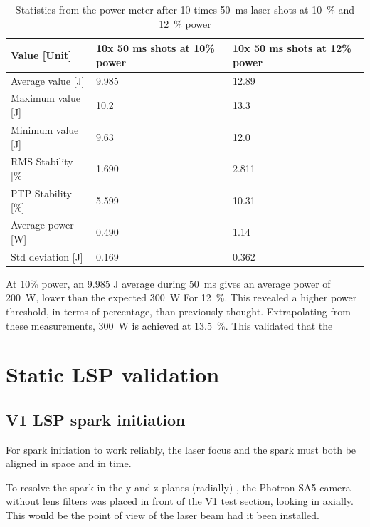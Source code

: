             \begin{table}[!ht]
                \caption{Statistics from the power meter after 10 times \qty{50}{ms} laser shots at \qty{10}{\%} and \qty{12}{\%} power}
                \label{tab:laser shot statistics}
                \begin{tabular}{lll}
                \textbf{Value {[}Unit{]}} & \textbf{10x 50 ms shots at 10\% power} & \textbf{10x 50 ms shots at 12\% power} \\ \hline
                Average value {[}J{]}  & 9.985 & 12.89 \\
                Maximum value {[}J{]}  & 10.2  & 13.3  \\
                Minimum value {[}J{]}  & 9.63  & 12.0  \\
                RMS Stability {[}\%{]} & 1.690 & 2.811 \\
                PTP Stability {[}\%{]} & 5.599 & 10.31 \\
                Average power {[}W{]}  & 0.490 & 1.14  \\
                Std deviation {[}J{]}  & 0.169 & 0.362 \\ \hline
                \end{tabular}
            \end{table}
            
            At 10\% power, an 9.985 J average during \qty{50}{ms} gives an average power of \qty{200}{W}, lower than the expected \qty{300}{W} For \qty{12}{\%}. This revealed a higher power threshold, in terms of percentage, than previously thought. Extrapolating from these measurements, \qty{300}{W} is achieved at \qty{13.5}{\%}. This validated that the

    \section{Static LSP validation}

        \subsection{V1 LSP spark initiation}

            For spark initiation to work reliably, the laser focus and the spark must both be aligned in space and in time.

            To resolve the spark in the y and z planes (radially) , the Photron SA5 camera without lens filters was placed in front of the V1 test section, looking in axially. This would be the point of view of the laser beam had it been installed. 

